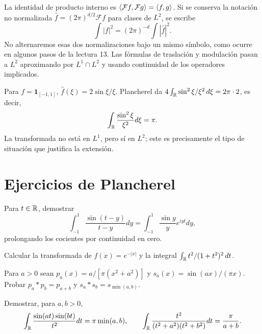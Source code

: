 La identidad de producto interno es $\left\langle\mathcal Ff,\mathcal Fg\right\rangle=\left\langle f,g\right\rangle$. Si se conserva la notación no normalizada $\widehat f=(2\pi)^{d/2}\mathcal Ff$ para clases de $L^2$, se escribe
\[
 \int|f|^2=(2\pi)^{-d}\int|\widehat f|^2.
\]
No alternaremos esas dos normalizaciones bajo un mismo símbolo, como ocurre en algunos pasos de la lectura 13. Las fórmulas de traslación y modulación pasan a $L^2$ aproximando por $L^1\cap L^2$ y usando continuidad de los operadores implicados.
\begin{ejemplo}
Para $f=\mathbf1_{[-1,1]}$, $\widehat f(\xi)=2\sin\xi/\xi$. Plancherel da $4\int_\mathbb R\sin^2\xi/\xi^2\,d\xi=2\pi\cdot2$, es decir,
\[
 \int_\mathbb R\frac{\sin^2\xi}{\xi^2}d\xi=\pi.
\]
La transformada no está en $L^1$, pero sí en $L^2$; este es precisamente el tipo de situación que justifica la extensión.
\end{ejemplo}

\section{Ejercicios de Plancherel}
\begin{ejercicio}\label{ej:v4-l13-1}
Para $t\in\mathbb R$, demostrar
\[
 \int_{-1}^1\frac{\sin(t-y)}{t-y}dy
 =\int_{-1}^1\frac{\sin y}{y}e^{iyt}dy,
\]
prolongando los cocientes por continuidad en cero.
\end{ejercicio}

\begin{ejercicio}\label{ej:v4-l13-2}
Calcular la transformada de $f(x)=e^{-|x|}$ y la integral $\int_\mathbb R t^2/(1+t^2)^2\,dt$.
\end{ejercicio}

\begin{ejercicio}\label{ej:v4-l13-3}
Para $a>0$ sean $p_a(x)=a/[\pi(x^2+a^2)]$ y $s_a(x)=\sin(ax)/(\pi x)$. Probar $p_a*p_b=p_{a+b}$ y $s_a*s_b=s_{\min(a,b)}$.
\end{ejercicio}

\begin{ejercicio}\label{ej:v4-l13-4}
Demostrar, para $a,b>0$,
\[
 \int_\mathbb R\frac{\sin(at)\sin(bt)}{t^2}dt=\pi\min(a,b),\qquad
 \int_\mathbb R\frac{t^2}{(t^2+a^2)(t^2+b^2)}dt=\frac\pi{a+b}.
\]
\end{ejercicio}


